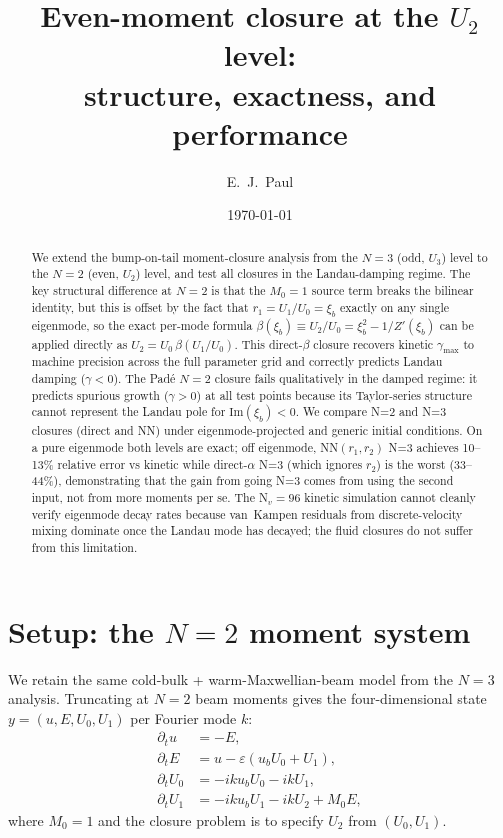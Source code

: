 \documentclass[11pt]{article}
\title{Even-moment closure at the \texorpdfstring{$U_2$}{U2} level:\\
       structure, exactness, and performance}
\author{E.~J.~Paul}
\date{\today}
\newcommand{\xib}{\xi_b}
\newcommand{\ub}{u_b}
\begin{document}
\maketitle

\begin{abstract}
We extend the bump-on-tail moment-closure analysis from the $N=3$ (odd,
$U_3$) level to the $N=2$ (even, $U_2$) level, and test all closures in
the Landau-damping regime.  The key structural difference at $N=2$ is that
the $M_0 = 1$ source term breaks the bilinear identity, but this is offset
by the fact that $r_1 = U_1/U_0 = \xib$ exactly on any single eigenmode,
so the exact per-mode formula
$\beta(\xib) \equiv U_2/U_0 = \xib^2 - 1/Z'(\xib)$
can be applied directly as $U_2 = U_0\,\beta(U_1/U_0)$.  This direct-$\beta$
closure recovers kinetic $\gamma_{\max}$ to machine precision across the full
parameter grid and correctly predicts Landau damping ($\gamma < 0$).
The Pad\'{e} $N=2$ closure fails qualitatively in the damped regime:
it predicts spurious growth ($\gamma > 0$) at all test points because its
Taylor-series structure cannot represent the Landau pole for
$\text{Im}(\xib) < 0$.  We compare N=2 and N=3 closures (direct and NN)
under eigenmode-projected and generic initial conditions.  On a pure
eigenmode both levels are exact; off eigenmode, NN$(r_1,r_2)$ N=3 achieves
10--13\% relative error vs kinetic while direct-$\alpha$ N=3 (which ignores
$r_2$) is the worst (33--44\%), demonstrating that the gain from going N=3
comes from using the second input, not from more moments per se.
The N$_v{=}96$ kinetic simulation cannot cleanly verify eigenmode decay
rates because van~Kampen residuals from discrete-velocity mixing dominate
once the Landau mode has decayed; the fluid closures do not suffer from
this limitation.
\end{abstract}

\section{Setup: the $N=2$ moment system}

We retain the same cold-bulk + warm-Maxwellian-beam model from the $N=3$
analysis.  Truncating at $N=2$ beam moments gives the four-dimensional
state $y = (u, E, U_0, U_1)$ per Fourier mode $k$:
\begin{align}
  \partial_t u   &= -E,
  \label{eq:u}\\
  \partial_t E   &= u - \varepsilon(\ub U_0 + U_1),
  \label{eq:E}\\
  \partial_t U_0 &= -ik\ub U_0 - ik U_1,
  \label{eq:U0}\\
  \partial_t U_1 &= -ik\ub U_1 - ik U_2 + M_0 E,
  \label{eq:U1}
\end{align}
where $M_0 = 1$ and the closure problem is to specify $U_2$ from
$(U_0, U_1)$.
\end{document}
